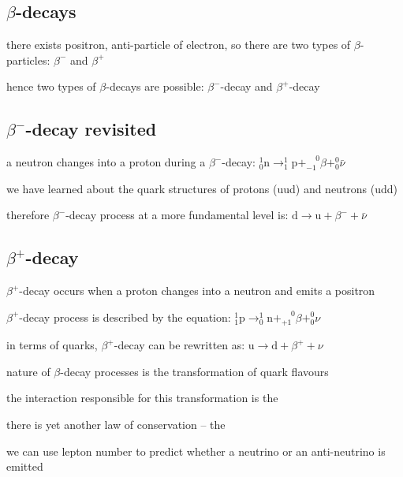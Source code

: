 \subsection{\texorpdfstring{$\beta$}{\textbeta}-decays}

there exists positron, anti-particle of electron, so there are two types of $\beta$-particles: $\beta^-$ and $\beta^+$

hence two types of $\beta$-decays are possible: $\beta^-$-decay and $\beta^+$-decay



\subsection*{\texorpdfstring{$\beta^-$}{\textbeta\textsubscript{-}}-decay revisited}

a neutron changes into a proton during a $\beta^-$-decay: $\boxed{_0^1 \text{n} \longrightarrow _1^1 \text{p} + _{-1}^{\phantom{+}0}\beta + _0^0 \bar{\nu}} $

we have learned about the quark structures of protons (uud) and neutrons (udd)

therefore $\beta^-$-decay process at a more fundamental level is: $ \boxed{\text{d} \longrightarrow \text{u} + \beta^- + \bar{\nu}} $


\subsection*{\texorpdfstring{$\beta^+$}{\textbeta\textsubscript{+}}-decay}


$\beta^+$-decay occurs when a proton changes into a neutron and emits a positron

$\beta^+$-decay process is described by the equation: $ \boxed{_1^1 \text{p} \longrightarrow _0^1 \text{n} + _{+1}^{\phantom{+}0}\beta + _0^0 \nu} $

in terms of quarks, $\beta^+$-decay can be rewritten as: $ \boxed{\text{u} \longrightarrow \text{d} + \beta^+ + \nu} $

\cmt nature of $\beta$-decay processes is the transformation of quark flavours

the interaction responsible for this transformation is the 

\cmt there is yet another law of conservation -- the 

we can use lepton number to predict whether a neutrino or an anti-neutrino is emitted

